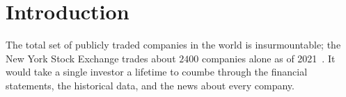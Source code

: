 \section{Introduction}

The total set of publicly traded companies in the world is insurmountable; the 
New York Stock Exchange trades about $2400$ companies alone as of 2021~\cite{WikiNYSE}.
It would take a single investor a lifetime to coumbe through the financial statements,
the historical data, and the news about every company.

\Fintech{} 


\newpage
